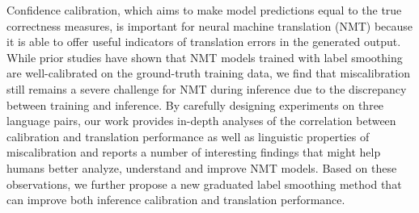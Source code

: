Confidence calibration, which aims to make model predictions equal to the true correctness measures, is important for neural machine translation (NMT) because it is able to offer useful indicators of translation errors in the generated output. While prior studies have shown that NMT models trained with label smoothing are well-calibrated on the ground-truth training data, we find that miscalibration still remains a severe challenge for NMT during inference due to the discrepancy between training and inference. By carefully designing experiments on three language pairs, our work provides in-depth analyses of the correlation between calibration and translation performance as well as linguistic properties of miscalibration and reports a number of interesting findings that might help humans better analyze, understand and improve NMT models. Based on these observations, we further propose a new graduated label smoothing method that can improve both inference calibration and translation performance.
